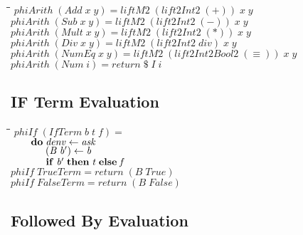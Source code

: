 \documentclass[10pt]{article}
\newlength{\lwidth}\setlength{\lwidth}{4.5cm}
\newlength{\cwidth}\setlength{\cwidth}{8mm} %
\newcommand{\Conid}[1]{\mathit{#1}}
\newcommand{\Varid}[1]{\mathit{#1}}
\begin{document}
\begin{tabbing}
\qquad\=\hspace{\lwidth}\=\hspace{\cwidth}\=\+\kill
${\Varid{phiArith}\;(\Conid{Add}\;\Varid{x}\;\Varid{y})\mathrel{=}\Varid{liftM2}\;(\Varid{lift2Int2}\;(\mathbin{+}))\;\Varid{x}\;\Varid{y}}$\\
${\Varid{phiArith}\;(\Conid{Sub}\;\Varid{x}\;\Varid{y})\mathrel{=}\Varid{liftM2}\;(\Varid{lift2Int2}\;(\mathbin{-}))\;\Varid{x}\;\Varid{y}}$\\
${\Varid{phiArith}\;(\Conid{Mult}\;\Varid{x}\;\Varid{y})\mathrel{=}\Varid{liftM2}\;(\Varid{lift2Int2}\;(\mathbin{*}))\;\Varid{x}\;\Varid{y}}$\\
${\Varid{phiArith}\;(\Conid{Div}\;\Varid{x}\;\Varid{y})\mathrel{=}\Varid{liftM2}\;(\Varid{lift2Int2}\;\Varid{div})\;\Varid{x}\;\Varid{y}}$\\
${\Varid{phiArith}\;(\Conid{NumEq}\;\Varid{x}\;\Varid{y})\mathrel{=}\Varid{liftM2}\;(\Varid{lift2Int2Bool2}\;(\equiv ))\;\Varid{x}\;\Varid{y}}$\\
${\Varid{phiArith}\;(\Conid{Num}\;\Varid{i})\mathrel{=}\Varid{return}\mathbin{\$}\Conid{I}\;\Varid{i}}$
\end{tabbing}
\subsection{IF Term Evaluation}

\begin{tabbing}
\qquad\=\hspace{\lwidth}\=\hspace{\cwidth}\=\+\kill
${\Varid{phiIf}\;(\Conid{IfTerm}\;\Varid{b}\;\Varid{t}\;\Varid{f})\mathrel{=}}$\\
${\hskip2.00em\relax\mathbf{do}\;\Varid{denv}\leftarrow \Varid{ask}}$\\
${\hskip2.00em\relax\phantom{\mathbf{do}\;\mbox{}}(\Conid{B}\;\Varid{b'})\leftarrow \Varid{b}}$\\
${\hskip2.00em\relax\phantom{\mathbf{do}\;\mbox{}}\mathbf{if}\;\Varid{b'}\;\mathbf{then}\;\Varid{t}\;\mathbf{else}\;\Varid{f}}$\\
${}$\\
${\Varid{phiIf}\;\Conid{TrueTerm}\mathrel{=}\Varid{return}\;(\Conid{B}\;\Conid{True})}$\\
${\Varid{phiIf}\;\Conid{FalseTerm}\mathrel{=}\Varid{return}\;(\Conid{B}\;\Conid{False})}$
\end{tabbing}
\subsection{Followed By Evaluation}
\end{document}
